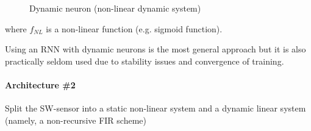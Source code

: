 \begin{figure}[H]
\begin{minipage}[t]{0.48\textwidth}
        \caption*{Dynamic neuron (non-linear dynamic system)}
    \end{minipage}
\end{figure}
where $f_{NL}$ is a non-linear function (e.g. sigmoid function).

Using an RNN with dynamic neurons is the most general approach but it is also practically seldom used due to stability issues and convergence of training.

\paragraph{Architecture \#2} Split the SW-sensor into a static non-linear system and a dynamic linear system (namely, a non-recursive FIR scheme)

